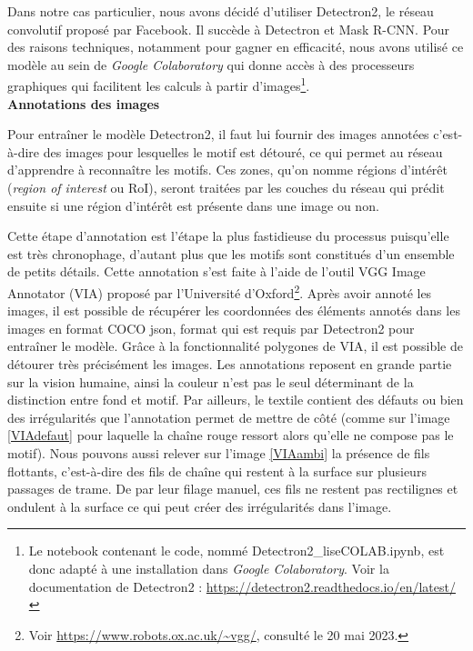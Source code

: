 \documentclass[a4paper, twoside, 12pt]{book}
\begin{document}
Dans notre cas particulier, nous avons décidé d'utiliser Detectron2, le réseau convolutif proposé par Facebook. Il succède à Detectron et Mask R-CNN.
Pour des raisons techniques, notamment pour gagner en efficacité, nous avons utilisé ce modèle au sein de \textit{Google Colaboratory} qui donne accès à des processeurs graphiques qui facilitent les calculs à partir d'images\footnote{Le notebook contenant le code, nommé \og Detectron2\_liseCOLAB.ipynb\fg, est donc adapté à une installation dans \textit{Google Colaboratory}. Voir la documentation de Detectron2 : \url{https://detectron2.readthedocs.io/en/latest/}}. \\

\textbf{Annotations des images}

Pour entraîner le modèle Detectron2, il faut lui fournir des images annotées c'est-à-dire des images pour lesquelles le motif est détouré, ce qui permet au réseau \og d'apprendre \fg \:à reconnaître les motifs. Ces zones, qu'on nomme régions d'intérêt (\textit{region of interest} ou RoI), seront traitées par les couches du réseau qui prédit ensuite si une région d'intérêt est présente dans une image ou non. 

Cette étape d'annotation est l'étape la plus fastidieuse du processus puisqu'elle est très chronophage, d'autant plus que les motifs sont constitués d'un ensemble de petits détails. Cette annotation s'est faite à l'aide de l'outil VGG Image Annotator (VIA) proposé par l'Université d'Oxford\footnote{Voir \url{https://www.robots.ox.ac.uk/~vgg/}, consulté le 20 mai 2023.}. Après avoir annoté les images, il est possible de récupérer les coordonnées des éléments annotés dans les images en format COCO json, format qui est requis par Detectron2 pour entraîner le modèle. Grâce à la fonctionnalité \og polygones \fg \:de VIA, il est possible de détourer très précisément les images. Les annotations reposent en grande partie sur la vision humaine, ainsi la couleur n'est pas le seul déterminant de la distinction entre fond et motif. Par ailleurs, le textile contient des défauts ou bien des irrégularités que l'annotation permet de mettre de côté (comme sur l'image \ref{VIAdefaut} pour laquelle la chaîne rouge ressort alors qu'elle ne compose pas le motif). Nous pouvons aussi relever sur l'image \ref{VIAambi} la présence de fils flottants, c'est-à-dire des fils de chaîne qui restent à la surface sur plusieurs passages de trame. De par leur filage manuel, ces fils ne restent pas rectilignes et ondulent à la surface ce qui peut créer des irrégularités dans l'image.
\end{document}
